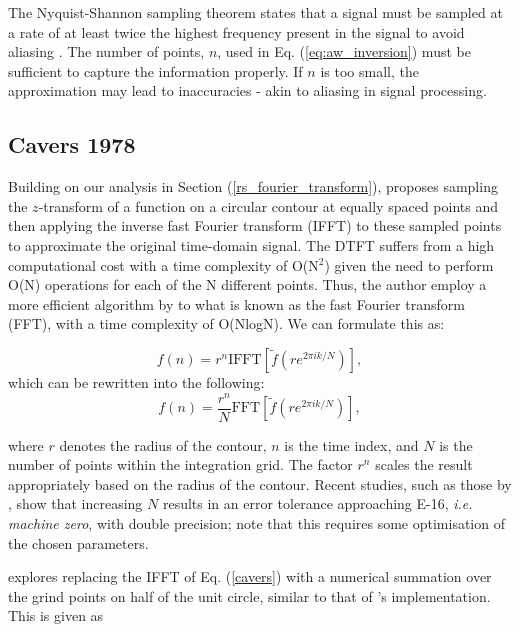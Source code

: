 \documentclass[a4paper]{report}
\begin{document}
The Nyquist-Shannon sampling theorem states that a signal must be sampled at a rate of at least twice the highest frequency present in the signal to avoid aliasing \citep{shannon1949communication,nyquist1928certain}. The number of points, $n$, used in Eq. (\ref{eq:aw_inversion}) must be sufficient to capture the information properly. If $n$ is too small, the approximation may lead to inaccuracies - akin to aliasing in signal processing.

\subsection{Cavers 1978}\label{section:cavers}
Building on our analysis in Section (\ref{rs_fourier_transform}), \citet{Cavers1978FFT} proposes sampling the $z$-transform of a function on a circular contour at equally spaced points and then applying the inverse fast Fourier transform (IFFT) to these sampled points to approximate the original time-domain signal. The DTFT suffers from a high computational cost with a time complexity of O(N$^2$) given the need to perform O(N) operations for each of the N different points. Thus, the author employ a more efficient algorithm by \citet{cooley1965algorithm} to what is known as the fast Fourier transform (FFT), with a time complexity of O(NlogN). We can formulate this as:

\begin{equation}\label{cavers}
	f(n) = r^n \text{IFFT}[\tilde{f}(re^{2\pi ik / N})],
\end{equation}
which can be rewritten into the following:
\begin{equation}
		f(n) = \frac{r^n}{N} \text{FFT}[\tilde{f}(re^{2\pi ik / N})],
\end{equation}

where $r$ denotes the radius of the contour, $n$ is the time index, and $N$ is the number of points within the integration grid. The factor $r^n$ scales the result appropriately based on the radius of the contour. Recent studies, such as those by \citet{loveless2021guido}, show that increasing \(N\) results in an error tolerance approaching E-16, \textit{i.e. machine zero}, with double precision; note that this requires some optimisation of the chosen parameters. 

\citet{loveless2023phelanguido} explores replacing the IFFT of Eq. (\ref{cavers}) with a numerical summation over the grind points on half of the unit circle, similar to that of \citet{AbateWhitt1992a, AbateWhitt1992b}'s implementation. This is given as
\end{document}
